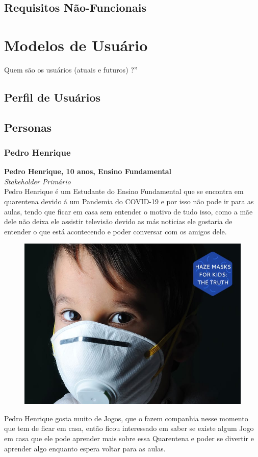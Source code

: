 \documentclass[12pt,brazil,a4paper]{article}
\begin{document}
\subsection{Requisitos Não-Funcionais}
\section{Modelos de Usuário}
\begin{description}
Quem são os usuários (atuais e futuros) ?” 
\end{description}
\subsection{Perfil de Usuários}
\subsection{Personas}
\subsubsection{Pedro Henrique}
\textbf{Pedro Henrique, 10 anos, Ensino Fundamental}\\
\textit{Stakeholder Primário}\\
Pedro Henrique é um Estudante do Ensino Fundamental que se encontra em quarentena devido á um Pandemia do COVID-19 e por 
isso não pode ir para as aulas, tendo que ficar em casa sem entender o motivo de tudo isso, como a mãe dele não deixa
ele assistir televisão devido as más noticias ele gostaria de entender o que está acontecendo e poder conversar com os amigos dele.\\
\begin{figure}
\includegraphics[width=1.0\linewidth]{children_1.jpg}
\end{figure}
Pedro Henrique gosta muito de Jogos, que o fazem companhia nesse momento que tem de ficar em casa, então ficou interessado em saber
se existe algum Jogo em casa que ele pode aprender mais sobre essa Quarentena e poder se divertir e aprender algo enquanto
espera voltar para as aulas.\\
\end{document}
